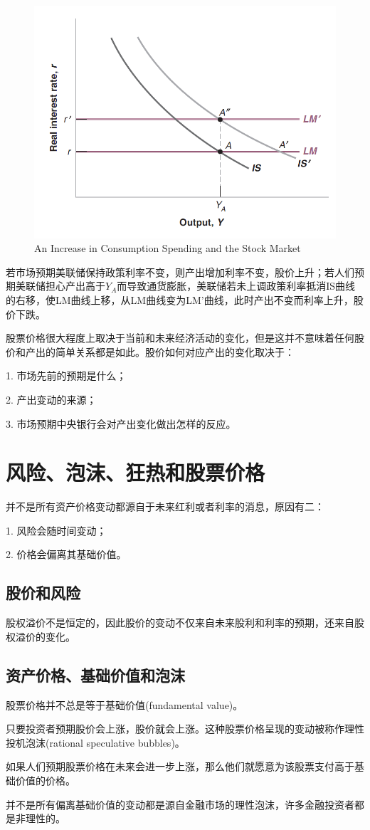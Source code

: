 \documentclass{article}
\begin{document}
\begin{figure}[H] %
	\centering %
	\includegraphics[width=1\textwidth]{14_2} %
	\caption{An Increase in
		Consumption Spending
		and the Stock Market} %
	\label{Fig.main3} %
\end{figure}

若市场预期美联储保持政策利率不变，则产出增加利率不变，股价上升；若人们预期美联储担心产出高于$ Y_A $而导致通货膨胀，美联储若未上调政策利率抵消IS曲线的右移，使LM曲线上移，从LM曲线变为LM'曲线，此时产出不变而利率上升，股价下跌。

股票价格很大程度上取决于当前和未来经济活动的变化，但是这并不意味着任何股价和产出的简单关系都是如此。股价如何对应产出的变化取决于：

1. 市场先前的预期是什么；

2. 产出变动的来源；

3. 市场预期中央银行会对产出变化做出怎样的反应。

\section{风险、泡沫、狂热和股票价格}

并不是所有资产价格变动都源自于未来红利或者利率的消息，原因有二：

1. 风险会随时间变动；

2. 价格会偏离其基础价值。

\subsection{股价和风险}

股权溢价不是恒定的，因此股价的变动不仅来自未来股利和利率的预期，还来自股权溢价的变化。

\subsection{资产价格、基础价值和泡沫}

股票价格并不总是等于基础价值(fundamental value)。

只要投资者预期股价会上涨，股价就会上涨。这种股票价格呈现的变动被称作理性投机泡沫(rational speculative bubbles)。

如果人们预期股票价格在未来会进一步上涨，那么他们就愿意为该股票支付高于基础价值的价格。

并不是所有偏离基础价值的变动都是源自金融市场的理性泡沫，许多金融投资者都是非理性的。
\end{document}
